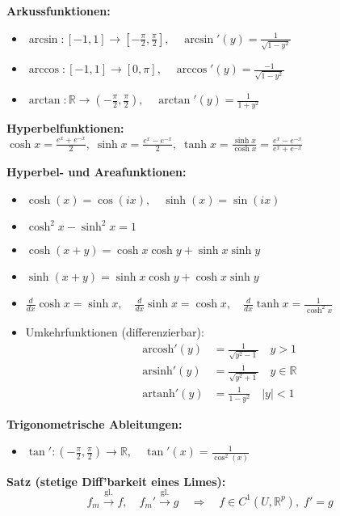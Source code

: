 \begin{itemize}
\textbf{Arkussfunktionen:}
\begin{itemize}
  \item \(\arcsin: [-1, 1] \to \left[-\tfrac{\pi}{2}, \tfrac{\pi}{2}\right], \quad \arcsin'(y) = \frac{1}{\sqrt{1 - y^2}}\)
  \item \(\arccos: [-1, 1] \to [0, \pi], \quad \arccos'(y) = \frac{-1}{\sqrt{1 - y^2}}\)
  \item \(\arctan: \mathbb{R} \to \left(-\tfrac{\pi}{2}, \tfrac{\pi}{2}\right), \quad \arctan'(y) = \frac{1}{1 + y^2}\)
\end{itemize}

\textbf{Hyperbelfunktionen:} \quad
\(\cosh x = \tfrac{e^x + e^{-x}}{2},\;
\sinh x = \tfrac{e^x - e^{-x}}{2},\;
\tanh x = \tfrac{\sinh x}{\cosh x} = \tfrac{e^x - e^{-x}}{e^x + e^{-x}}\)


\textbf{Hyperbel- und Areafunktionen:}
\begin{itemize}
  \item \(\cosh(x) = \cos(ix),\quad \sinh(x) = \sin(ix)\)
  \item \(\cosh^2 x - \sinh^2 x = 1\)
  \item \(\cosh(x+y) = \cosh x \cosh y + \sinh x \sinh y\)
  \item \(\sinh(x+y) = \sinh x \cosh y + \cosh x \sinh y\)
  \item \(\frac{d}{dx} \cosh x = \sinh x,\quad \frac{d}{dx} \sinh x = \cosh x,\quad \frac{d}{dx} \tanh x = \frac{1}{\cosh^2 x}\)
  \item Umkehrfunktionen (differenzierbar):
  \[
  \begin{aligned}
  \text{arcosh}'(y) &= \frac{1}{\sqrt{y^2 - 1}} \quad y > 1 \\
  \text{arsinh}'(y) &= \frac{1}{\sqrt{y^2 + 1}} \quad y \in \mathbb{R} \\
  \text{artanh}'(y) &= \frac{1}{1 - y^2} \quad |y| < 1
  \end{aligned}
  \]
\end{itemize}


\textbf{Trigonometrische Ableitungen:}
\begin{itemize}
  \item \(\tan': \left(-\tfrac{\pi}{2}, \tfrac{\pi}{2}\right) \to \mathbb{R}, \quad \tan'(x) = \frac{1}{\cos^2(x)}\)
\end{itemize}

\textbf{Satz (stetige Diff'barkeit eines Limes):}  
\[
f_m \xrightarrow{\text{gl.}} f,\quad f_m' \xrightarrow{\text{gl.}} g
\quad\Rightarrow\quad f \in C^1(U, \mathbb{R}^p),\; f' = g
\]



\end{itemize}
